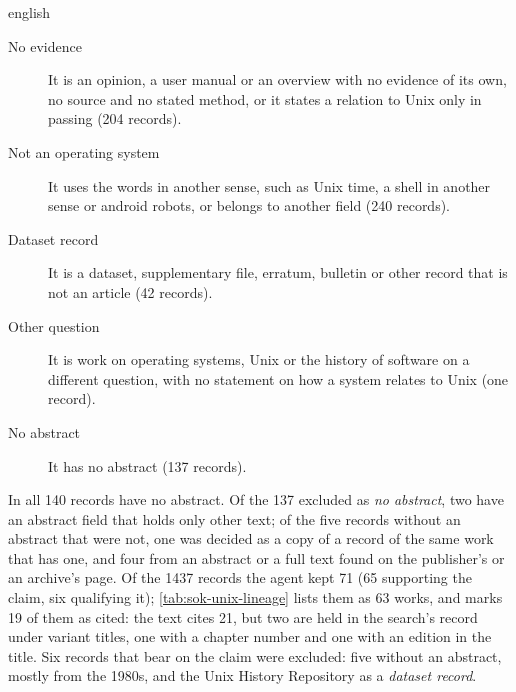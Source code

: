 \begin{onlyin}{english}
\begin{description}
  \item[No evidence] It is an opinion, a user manual or an overview with
    no evidence of its own, no source and no stated method, or it states
    a relation to Unix only in passing (204 records).
  \item[Not an operating system] It uses the words in another sense,
    such as Unix time, a shell in another sense or android robots, or
    belongs to another field (240 records).
  \item[Dataset record] It is a dataset, supplementary file, erratum,
    bulletin or other record that is not an article (42 records).
  \item[Other question] It is work on operating systems, Unix or the
    history of software on a different question, with no statement on
    how a system relates to Unix (one record).
  \item[No abstract] It has no abstract (137 records).
\end{description}
In all 140 records have no abstract.  Of the 137 excluded as \emph{no
abstract}, two have an abstract field that holds only other text; of
the five records without an abstract that were not, one was decided as
a copy of a record of the same work that has one, and four from an
abstract or a full text found on the publisher's or an archive's page.
Of the 1437 records the agent kept 71 (65 supporting the claim, six
qualifying it); \cref{tab:sok-unix-lineage} lists them as 63 works, and
marks 19 of them as cited: the text cites 21, but two are held in the
search's record under variant titles, one with a chapter number and one
with an edition in the title.  Six records that bear on the claim
were excluded: five without an abstract, mostly from the 1980s, and the
Unix History Repository as a \emph{dataset record}.
\end{onlyin}
